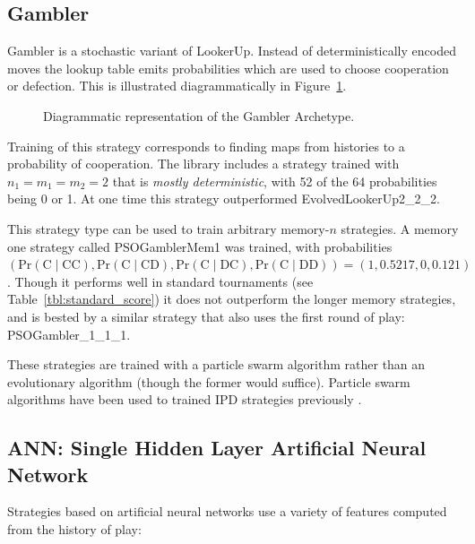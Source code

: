\documentclass{article}
\begin{document}
\subsection{Gambler}\label{sec:gambler}

Gambler is a stochastic variant of LookerUp. Instead of deterministically
encoded moves the lookup table emits probabilities which are
used to choose cooperation or defection.
This is illustrated diagrammatically in Figure~\ref{fig:gambler}.

\begin{figure}[!hbtp]
    \centering
    
    \caption{Diagrammatic representation of the Gambler Archetype.}
    \label{fig:gambler}
\end{figure}

Training of this strategy corresponds to finding maps from histories to
a probability of cooperation. The library includes a strategy trained
with $n_1 = m_1 = m_2 = 2$ that is \emph{mostly deterministic}, with 52 of the 64
probabilities being 0 or 1. At one time this strategy outperformed
EvolvedLookerUp2\_2\_2.

This strategy type can be used to train arbitrary memory-$n$ strategies. A
memory one strategy called PSOGamblerMem1 was trained, with
probabilities $(\text{Pr}(\text{C}\;|\;\text{CC}),
                \text{Pr}(\text{C}\;|\;\text{CD}),
                \text{Pr}(\text{C}\;|\;\text{DC}),
                \text{Pr}(\text{C}\;|\;\text{DD})) = (1, 0.5217, 0, 0.121)$.
Though it performs well in standard tournaments (see
Table~\ref{tbl:standard_score})
it does not outperform the longer memory strategies, and is bested by a similar
strategy that also uses the first round of play: PSOGambler\_1\_1\_1.

These strategies are trained with a particle swarm algorithm rather than an
evolutionary algorithm (though the former would suffice). Particle swarm
algorithms have been used to trained IPD strategies previously
\cite{franken2005particle}.

\subsection{ANN: Single Hidden Layer Artificial Neural Network}

Strategies based on artificial neural networks use a variety of features
computed from the history of play:
\end{document}
